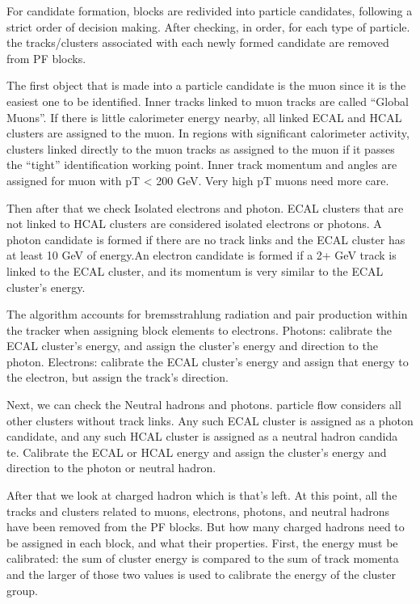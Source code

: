 For candidate formation, blocks are redivided into particle candidates, following a strict order of decision making. After checking, in order, for each type of particle. the tracks/clusters associated with each newly formed candidate are removed from PF blocks.


The first object that is made into a particle candidate is the muon since it is the easiest one to be identified. Inner tracks linked to muon tracks are called “Global Muons”. If there is little calorimeter energy nearby, all linked ECAL and HCAL clusters are assigned to the muon. In regions with significant calorimeter activity, clusters linked directly to the muon tracks as assigned to the muon if it passes the “tight” identification working point. Inner track momentum and angles are assigned for muon with pT < 200 GeV. Very high pT muons need more care.

Then after that we check Isolated electrons and photon. ECAL clusters that are not linked to HCAL clusters are considered isolated electrons or photons.  A photon candidate is formed if there are no track links and the ECAL cluster has at least 10 GeV of energy.An electron candidate is formed if a 2+ GeV track is linked to the ECAL cluster, and its momentum is very similar to the ECAL cluster’s energy.

The algorithm accounts for bremsstrahlung radiation and pair production within the tracker when assigning block elements to electrons. Photons: calibrate the ECAL cluster’s energy, and assign the cluster’s energy and direction to the photon. Electrons: calibrate the ECAL cluster’s energy and assign that energy to the electron, but assign the track’s direction.

Next, we can check the Neutral hadrons and photons. particle flow considers all other clusters without track links. Any such ECAL cluster is assigned as a photon candidate, and any such HCAL cluster is assigned as a neutral hadron candida te. Calibrate the ECAL or HCAL energy and assign the cluster’s energy and direction to the photon or neutral hadron.

 After that we look at charged hadron which is that’s left. At this point, all the tracks and clusters related to muons, electrons, photons, and neutral hadrons have been removed from the PF blocks.  But how many charged hadrons need to be assigned in each block, and what their properties. First, the energy must be calibrated: the sum of cluster energy is compared to the sum of track momenta and the larger of those two values is used to calibrate the energy of the cluster group.


